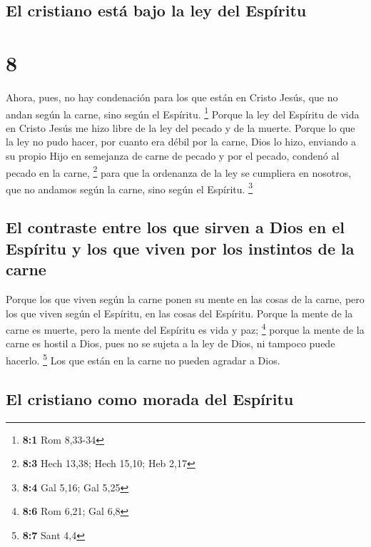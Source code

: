 \hypertarget{el-cristiano-estuxe1-bajo-la-ley-del-espuxedritu}{%
\subsection{El cristiano está bajo la ley del
Espíritu}\label{el-cristiano-estuxe1-bajo-la-ley-del-espuxedritu}}

\hypertarget{section-7}{%
\section{8}\label{section-7}}

 Ahora, pues, no hay condenación para los que están en
Cristo Jesús, que no andan según la carne, sino según el Espíritu.
\footnote{\textbf{8:1} Rom 8,33-34}  Porque la ley del
Espíritu de vida en Cristo Jesús me hizo libre de la ley del pecado y de
la muerte.  Porque lo que la ley no pudo hacer, por cuanto
era débil por la carne, Dios lo hizo, enviando a su propio Hijo en
semejanza de carne de pecado y por el pecado, condenó al pecado en la
carne, \footnote{\textbf{8:3} Hech 13,38; Hech 15,10; Heb 2,17}
 para que la ordenanza de la ley se cumpliera en nosotros,
que no andamos según la carne, sino según el Espíritu. \footnote{\textbf{8:4}
  Gal 5,16; Gal 5,25}

\hypertarget{el-contraste-entre-los-que-sirven-a-dios-en-el-espuxedritu-y-los-que-viven-por-los-instintos-de-la-carne}{%
\subsection{El contraste entre los que sirven a Dios en el Espíritu y
los que viven por los instintos de la
carne}\label{el-contraste-entre-los-que-sirven-a-dios-en-el-espuxedritu-y-los-que-viven-por-los-instintos-de-la-carne}}

 Porque los que viven según la carne ponen su mente en las
cosas de la carne, pero los que viven según el Espíritu, en las cosas
del Espíritu.  Porque la mente de la carne es muerte, pero
la mente del Espíritu es vida y paz; \footnote{\textbf{8:6} Rom 6,21;
  Gal 6,8}  porque la mente de la carne es hostil a Dios,
pues no se sujeta a la ley de Dios, ni tampoco puede hacerlo.
\footnote{\textbf{8:7} Sant 4,4}  Los que están en la
carne no pueden agradar a Dios.

\hypertarget{el-cristiano-como-morada-del-espuxedritu}{%
\subsection{El cristiano como morada del
Espíritu}\label{el-cristiano-como-morada-del-espuxedritu}}

